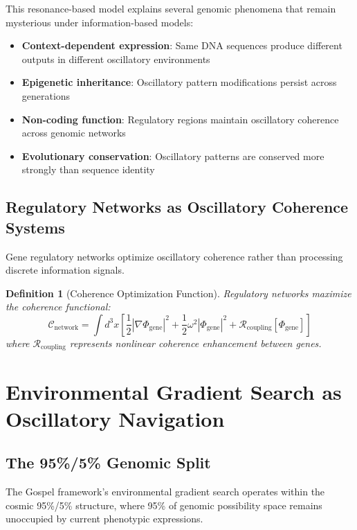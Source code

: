 \documentclass[12pt,a4paper]{article}
\newtheorem{definition}[theorem]{Definition}
\begin{document}
This resonance-based model explains several genomic phenomena that remain mysterious under information-based models:

\begin{itemize}
\item \textbf{Context-dependent expression}: Same DNA sequences produce different outputs in different oscillatory environments
\item \textbf{Epigenetic inheritance}: Oscillatory pattern modifications persist across generations
\item \textbf{Non-coding function}: Regulatory regions maintain oscillatory coherence across genomic networks
\item \textbf{Evolutionary conservation}: Oscillatory patterns are conserved more strongly than sequence identity
\end{itemize}

\subsection{Regulatory Networks as Oscillatory Coherence Systems}

Gene regulatory networks optimize oscillatory coherence rather than processing discrete information signals.

\begin{definition}[Coherence Optimization Function]
Regulatory networks maximize the coherence functional:
$$\mathcal{C}_{\text{network}} = \int d^3x \left[\frac{1}{2}|\nabla\Phi_{\text{gene}}|^2 + \frac{1}{2}\omega^2|\Phi_{\text{gene}}|^2 + \mathcal{R}_{\text{coupling}}[\Phi_{\text{gene}}]\right]$$
where $\mathcal{R}_{\text{coupling}}$ represents nonlinear coherence enhancement between genes.
\end{definition}

\section{Environmental Gradient Search as Oscillatory Navigation}

\subsection{The 95\%/5\% Genomic Split}

The Gospel framework's environmental gradient search operates within the cosmic 95\%/5\% structure, where 95\% of genomic possibility space remains unoccupied by current phenotypic expressions.
\end{document}
